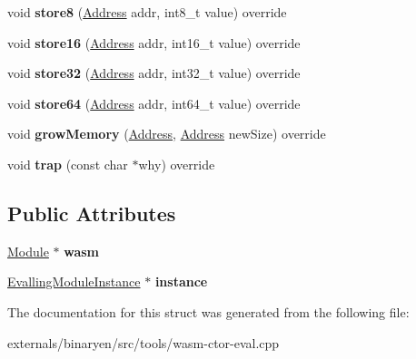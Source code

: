 \begin{DoxyCompactItemize}
void {\bfseries store8} (\mbox{\hyperlink{structwasm_1_1_address}{Address}} addr, int8\+\_\+t value) override
\item 
\mbox{\label{struct_ctor_eval_external_interface_a8b3eb5f51ae8d7644a91a5a62d474a98}} 
void {\bfseries store16} (\mbox{\hyperlink{structwasm_1_1_address}{Address}} addr, int16\+\_\+t value) override
\item 
\mbox{\label{struct_ctor_eval_external_interface_a3b0e8cb3057d2778017fa443769f7f65}} 
void {\bfseries store32} (\mbox{\hyperlink{structwasm_1_1_address}{Address}} addr, int32\+\_\+t value) override
\item 
\mbox{\label{struct_ctor_eval_external_interface_a5d9b33f14f1e34831f5c726dc8a92ddc}} 
void {\bfseries store64} (\mbox{\hyperlink{structwasm_1_1_address}{Address}} addr, int64\+\_\+t value) override
\item 
\mbox{\label{struct_ctor_eval_external_interface_a37e61a206ea4b4bc1b6386c31ebc0776}} 
void {\bfseries grow\+Memory} (\mbox{\hyperlink{structwasm_1_1_address}{Address}}, \mbox{\hyperlink{structwasm_1_1_address}{Address}} new\+Size) override
\item 
\mbox{\label{struct_ctor_eval_external_interface_a65e792e825fc6667a73cadd3440befde}} 
void {\bfseries trap} (const char $\ast$why) override
\end{DoxyCompactItemize}
\subsection*{Public Attributes}
\begin{DoxyCompactItemize}
\item 
\mbox{\label{struct_ctor_eval_external_interface_a8f96e89360fe845b48bf662ae2c4c4d1}} 
\mbox{\hyperlink{classwasm_1_1_module}{Module}} $\ast$ {\bfseries wasm}
\item 
\mbox{\label{struct_ctor_eval_external_interface_a4c9b74cb47367fc737cf7ff8db3989b1}} 
\mbox{\hyperlink{class_evalling_module_instance}{Evalling\+Module\+Instance}} $\ast$ {\bfseries instance}
\end{DoxyCompactItemize}


The documentation for this struct was generated from the following file\+:\begin{DoxyCompactItemize}
\item 
externals/binaryen/src/tools/wasm-\/ctor-\/eval.\+cpp\end{DoxyCompactItemize}
